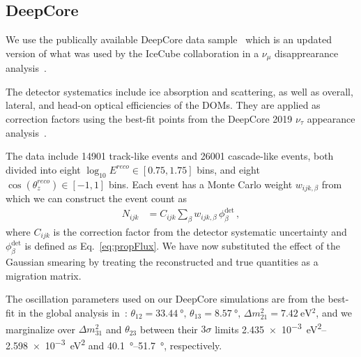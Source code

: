 \documentclass[draft=True]{revtex4-2}
\newcommand{\zreco}{\ensuremath{\cos{(\theta_z^{reco})}}}
\newcommand{\dm}{\Delta m^2_{31}}
\begin{document}
\subsection{DeepCore}\label{ch:DCmethod}
We use the publically available DeepCore data sample~\cite{DC2019data} which is an updated version of what was used by the 
IceCube collaboration in a $\nu_\mu$ disapprearance analysis~\cite{DC2018mudisappearance}.

The detector systematics include ice absorption and scattering, as well as overall, lateral, and head-on optical efficiencies of the DOMs. 
They are applied as correction factors using the best-fit points from the DeepCore 2019 $\nu_\tau$ appearance 
analysis~\cite{DC2019tauappearance}.

The data include 14901 track-like events and 26001 cascade-like events, both divided into eight 
$ \log_{10}E^{reco} \in [0.75,1.75]$ bins, and eight $\zreco \in [-1,1]$ bins. Each event has a Monte Carlo weight $w_{ijk,\beta}$
from which we can construct the event count as
\begin{align}\label{eq:MCevents}
    N_{ijk} &= C_{ijk}\sum_{\beta}w_{ijk,\beta}\, \phi_\beta^\text{det}\,,
\end{align}
where $C_{ijk}$ is the correction factor from the detector systematic uncertainty and $\phi_\beta^\text{det}$ is defined as Eq.~\ref{eq:propFlux}. We have now substituted the effect of the Gaussian smearing 
by treating the reconstructed and true quantities as a migration matrix. 

The oscillation parameters used on our DeepCore simulations are from the
best-fit in the global analysis in~\cite{nufit}: $\theta_{12} = \SI{33.44}{\degree},\, \theta_{13} = \SI{8.57}{\degree},\, \Delta m^2_{21} =  \SI{7.42}{\electronvolt^2}$, and we 
marginalize over $\dm$ and $\theta_{23}$ between their $3\sigma$ limits \SIrange{2.435e-3}{2.598e-3}{\eV \squared} and \SIrange{40.1}{51.7}{\degree}, respectively.

\end{document}
